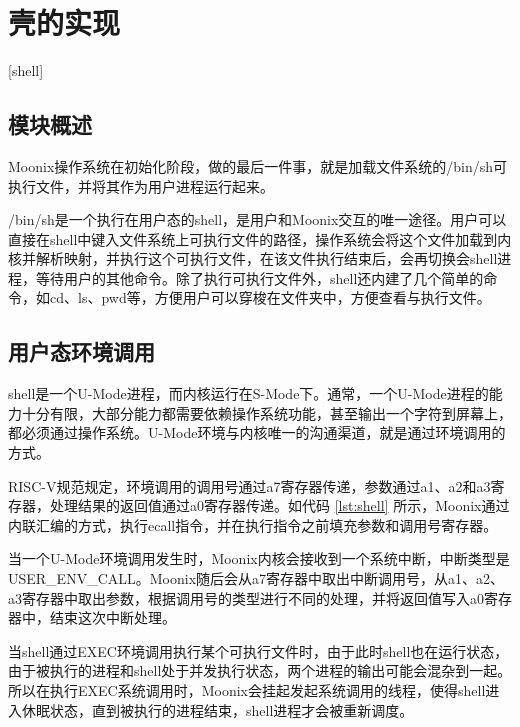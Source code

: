 
\chapter{壳的实现}[shell]
\label{chapter:shell}

\section{模块概述}

Moonix操作系统在初始化阶段，做的最后一件事，就是加载文件系统的/bin/sh可执行文件，并将其作为用户进程运行起来。

/bin/sh是一个执行在用户态的shell，是用户和Moonix交互的唯一途径。用户可以直接在shell中键入文件系统上可执行文件的路径，操作系统会将这个文件加载到内核并解析映射，并执行这个可执行文件，在该文件执行结束后，会再切换会shell进程，等待用户的其他命令。除了执行可执行文件外，shell还内建了几个简单的命令，如cd、ls、pwd等，方便用户可以穿梭在文件夹中，方便查看与执行文件。

\section{用户态环境调用}

shell是一个U-Mode进程，而内核运行在S-Mode下。通常，一个U-Mode进程的能力十分有限，大部分能力都需要依赖操作系统功能，甚至输出一个字符到屏幕上，都必须通过操作系统。U-Mode环境与内核唯一的沟通渠道，就是通过环境调用的方式。

RISC-V规范规定，环境调用的调用号通过a7寄存器传递，参数通过a1、a2和a3寄存器，处理结果的返回值通过a0寄存器传递。如代码 \ref{lst:shell} 所示，Moonix通过内联汇编的方式，执行ecall指令，并在执行指令之前填充参数和调用号寄存器。

当一个U-Mode环境调用发生时，Moonix内核会接收到一个系统中断，中断类型是USER\_ENV\_CALL。Moonix随后会从a7寄存器中取出中断调用号，从a1、a2、a3寄存器中取出参数，根据调用号的类型进行不同的处理，并将返回值写入a0寄存器中，结束这次中断处理。

当shell通过EXEC环境调用执行某个可执行文件时，由于此时shell也在运行状态，由于被执行的进程和shell处于并发执行状态，两个进程的输出可能会混杂到一起。所以在执行EXEC系统调用时，Moonix会挂起发起系统调用的线程，使得shell进入休眠状态，直到被执行的进程结束，shell进程才会被重新调度。

